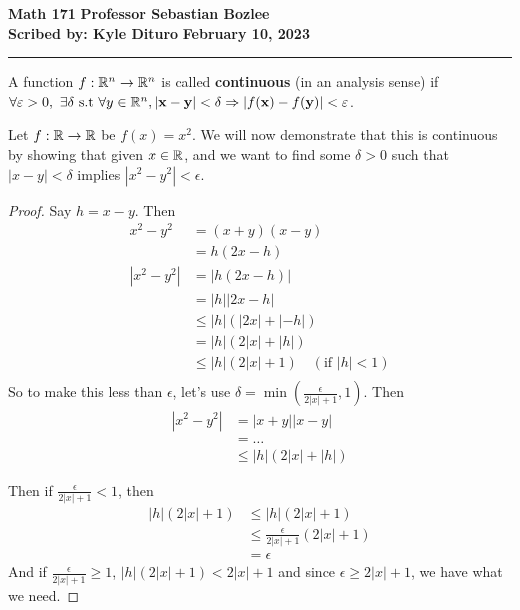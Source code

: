 \documentclass[12pt, twosided]{article}
\begin{document}
\noindent \textbf{Math 171} \hfill \textbf{Professor Sebastian Bozlee} \\
\textbf{Scribed by: Kyle Dituro} \hfill \textbf{February 10, 2023}\hrule
\vspace{.2in}

\begin{df}
  A function \(f: \mathbb{R}^n \to \mathbb{R}^n\) is called \textbf{continuous} (in an analysis sense) if \(\forall \varepsilon > 0,\ \exists \delta \text{ s.t } \forall y \in \mathbb{R}^n, |\mathbf{x} - \mathbf{y}| < \delta \Rightarrow |f(\mathbf{x}) - f(\mathbf{y})| < \varepsilon\).
\end{df}

\begin{exa}
  Let \(f: \mathbb{R} \to \mathbb{R} \) be \(f(x) = x^2\). We will now demonstrate that this is continuous by showing that given \(x \in \mathbb{R}\), and we want to find some \(\delta > 0\) such that \(|x - y| < \delta \) implies \(|x^2 - y^2| < \epsilon\).

  \begin{proof}
    Say \(h = x - y\). Then
    \begin{align*}
      x^2 - y^2 &= (x + y)(x - y) \\
                &= h(2x - h) \\
      |x^2 - y^2| &= |h(2x - h)| \\
                &= |h||2x-h| \\
                &\leq |h|(|2x| + |-h|) \\
                &= |h|(2|x| + |h|) \\
                &\leq |h|(2|x| + 1) \quad (\text{if } |h| < 1) \\
    \end{align*}
    So to make this less than \(\epsilon\), let's use \(\delta = \min\left(\frac{\epsilon}{2|x|+1},1\right).\) Then
    \begin{align*}
      |x^2 - y^2| &= |x + y||x - y| \\
                  &=\ldots \\
                  &\leq |h|(2|x| + |h|)
    \end{align*}

    Then if \(\frac{\epsilon}{2|x| + 1} < 1\), then
    \begin{align*}
      |h|(2|x| + 1) &\leq |h|(2|x| + 1) \\
                    &\leq \frac{\epsilon}{2|x| + 1}(2|x| + 1) \\
                    &= \epsilon
    \end{align*}
    And if \(\frac{\epsilon}{2|x| + 1} \geq 1\),
      \(|h|(2|x| + 1) < 2|x| + 1\) and since \(\epsilon \geq 2|x| + 1\), we have what we need.
  \end{proof}
\end{exa}
\end{document}
